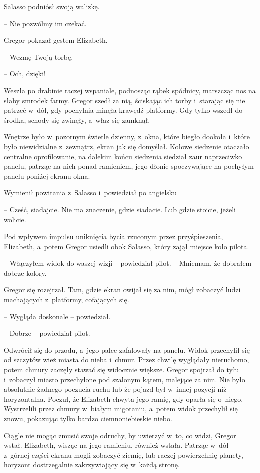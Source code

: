 \documentclass[oneside,polish,12pt,sfheadings]{mwbk}
\begin{document}
Salasso podniósł swoją walizkę.

-- Nie pozwólmy im czekać.

Gregor pokazał gestem Elizabeth. 

-- Wezmę Twoją torbę. 

-- Och, dzięki!

Weszła po drabinie raczej wspaniale, podnosząc rąbek spódnicy, marszcząc
nos na słaby smrodek farmy. Gregor szedł za nią, ściskając ich torby i~starając się nie patrzeć w~dół, gdy pochylnia minęła krawędź platformy.
Gdy tylko wszedł do środka, schody się zwinęły, a~właz się zamknął.

Wnętrze było w~pozornym świetle dzienny, z~okna, które biegło dookoła i~które było niewidzialne z~zewnątrz, ekran jak się domyślał. Kołowe
siedzenie otaczało centralne oprofilowanie, na dalekim końcu siedzenia
siedział zaur naprzeciwko panelu, patrząc na nich ponad ramieniem, jego
dłonie spoczywające na pochyłym panelu poniżej ekranu-okna.

Wymienił powitania z~Salasso i~powiedział po angielsku 

-- Cześć,
siadajcie. Nie ma znaczenie, gdzie siadacie. Lub gdzie stoicie, jeżeli
wolicie.

Pod wpływem impulsu uniknięcia bycia rzuconym przez przyśpieszenia,
Elizabeth, a~potem Gregor usiedli obok Salasso, który zajął miejsce koło
pilota.

-- Włączyłem widok do waszej wizji -- powiedział pilot. -- Mniemam, że
dobrałem dobrze kolory.

Gregor się rozejrzał. Tam, gdzie ekran owijał się za nim, mógł zobaczyć
ludzi machających z~platformy, cofających się.

-- Wygląda doskonale -- powiedział.

-- Dobrze -- powiedział pilot.

Odwrócił się do przodu, a~jego palce zafalowały na panelu. Widok
przechylił się od szczytów wież miasta do nieba i~chmur. Przez chwilę
wyglądały nieruchomo, potem chmury zaczęły stawać się widocznie większe.
Gregor spojrzał do tyłu i~zobaczył miasto przechylone pod szalonym
kątem, malejące za nim. Nie było absolutnie żadnego poczucia ruchu lub
że pojazd był w~innej pozycji niż horyzontalna. Poczuł, że Elizabeth
chwyta jego ramię, gdy oparła się o~niego. Wystrzelili przez chmury w~białym migotaniu, a~potem widok przechylił się znowu, pokazując tylko
bardzo ciemnoniebieskie niebo.

Ciągle nie mogąc zmusić swoje odruchy, by uwierzyć w~to, co widzi,
Gregor wstał. Elizabeth, wisząc na jego ramieniu, również wstała.
Patrząc w~dół z~górnej części ekranu mogli zobaczyć ziemię, lub raczej
powierzchnię planety, horyzont dostrzegalnie zakrzywiający się w~każdą
stronę.
\end{document}
